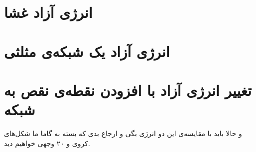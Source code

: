 \section{
انرژی آزاد غشا
}



\section{
انرژی آزاد یک شبکه‌ی مثلثی
}


\section{
تغییر انرژی آزاد با افزودن نقطه‌ی نقص به شبکه
}


 و حالا باید با مقایسه‌ی این دو انرژی بگی و ارجاع بدی که بسته به گاما ما شکل‌های کروی و ۲۰ وجهی خواهیم دید.






